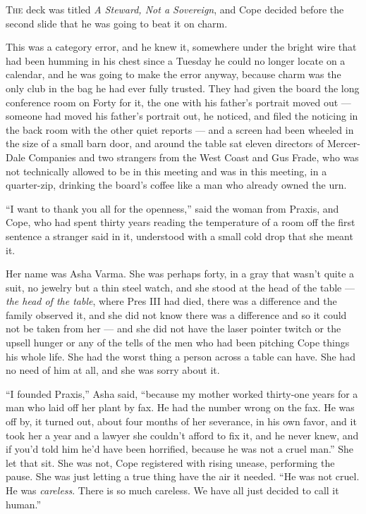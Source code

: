 \documentclass[11pt,openany]{book}
\begin{document}
\lettrine[lines=3, lhang=0.05, nindent=0.25em]{T}{he} deck was titled \textit{A Steward, Not a Sovereign}, and Cope decided before the second slide that he was going to beat it on charm.

This was a category error, and he knew it, somewhere under the bright wire that had been humming in his chest since a Tuesday he could no longer locate on a calendar, and he was going to make the error anyway, because charm was the only club in the bag he had ever fully trusted. They had given the board the long conference room on Forty for it, the one with his father's portrait moved out --- someone had moved his father's portrait out, he noticed, and filed the noticing in the back room with the other quiet reports --- and a screen had been wheeled in the size of a small barn door, and around the table sat eleven directors of Mercer-Dale Companies and two strangers from the West Coast and Gus Frade, who was not technically allowed to be in this meeting and was in this meeting, in a quarter-zip, drinking the board's coffee like a man who already owned the urn.

``I want to thank you all for the openness,'' said the woman from Praxis, and Cope, who had spent thirty years reading the temperature of a room off the first sentence a stranger said in it, understood with a small cold drop that she meant it.

Her name was Asha Varma. She was perhaps forty, in a gray that wasn't quite a suit, no jewelry but a thin steel watch, and she stood at the head of the table --- \textit{the head of the table}, where Pres III had died, there was a difference and the family observed it, and she did not know there was a difference and so it could not be taken from her --- and she did not have the laser pointer twitch or the upsell hunger or any of the tells of the men who had been pitching Cope things his whole life. She had the worst thing a person across a table can have. She had no need of him at all, and she was sorry about it.

``I founded Praxis,'' Asha said, ``because my mother worked thirty-one years for a man who laid off her plant by fax. He had the number wrong on the fax. He was off by, it turned out, about four months of her severance, in his own favor, and it took her a year and a lawyer she couldn't afford to fix it, and he never knew, and if you'd told him he'd have been horrified, because he was not a cruel man.'' She let that sit. She was not, Cope registered with rising unease, performing the pause. She was just letting a true thing have the air it needed. ``He was not cruel. He was \textit{careless}. There is so much careless. We have all just decided to call it human.''
\end{document}
